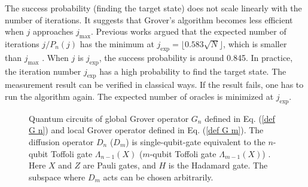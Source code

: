 \documentclass[%
 twocolumn,
 10pt,
 superscriptaddress,
 longbibliography,
 amsmath,amssymb,
 aps,
 pra,
floatfix,
]{revtex4-1}
\begin{document}
The success probability (finding the target state) does not scale linearly with the number of iterations. It suggests that Grover's algorithm becomes less efficient when $j$ approaches $j_\text{max}$. Previous works argued that the expected number of iterations $j/P_n(j)$ has the minimum at $j_\text{exp}=\lfloor 0.583\sqrt N \rfloor$, which is smaller than $j_\text{max}$ \cite{BBHT98,GWC00}. When $j$ is $j_\text{exp}$, the success probability is around 0.845. In practice, the iteration number $j_\text{exp}$ has a high probability to find the target state. The measurement result can be verified in classical ways. If the result fails, one has to run the algorithm again. The expected number of oracles is minimized at $j_\text{exp}$.

\begin{figure}
	\hfill
	\caption{Quantum circuits of global Grover operator $G_n$ defined in Eq. (\ref{def G n}) and local Grover operator defined in Eq. (\ref{def G m}). The diffusion operator $D_n$ ($D_m$) is single-qubit-gate equivalent to the $n$-qubit Toffoli gate $\Lambda_{n-1}(X)$ ($m$-qubit Toffoli gate $\Lambda_{m-1}(X)$) \cite{NC10}. Here $X$ and $Z$ are Pauli gates, and $H$ is the Hadamard gate. The subspace where $D_m$ acts can be chosen arbitrarily.}
	\label{fig G n m}
\end{figure}
\end{document}
